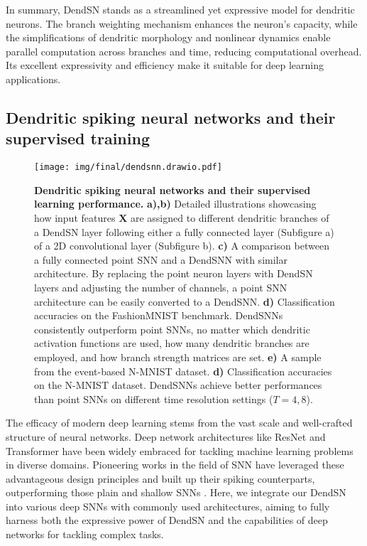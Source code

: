 In summary, DendSN stands as a streamlined yet expressive model for dendritic neurons. The branch weighting mechanism enhances the neuron's capacity, while the simplifications of dendritic morphology and nonlinear dynamics enable parallel computation across branches and time, reducing computational overhead. Its excellent expressivity and efficiency make it suitable for deep learning applications.

\subsection*{Dendritic spiking neural networks and their supervised training}
\label{subsec:results-dendsnn}

\begin{figure*}[tp!]
    \centering
    \texttt{[image: img/final/dendsnn.drawio.pdf]}
    \caption{
        \textbf{Dendritic spiking neural networks and their supervised learning performance.}
        \textbf{a),b)} Detailed illustrations showcasing how input features $\mathbf{X}$ are assigned to different dendritic branches of a DendSN layer following either a fully connected layer (Subfigure a) of a 2D convolutional layer (Subfigure b).
        \textbf{c)} A comparison between a fully connected point SNN and a DendSNN with similar architecture. By replacing the point neuron layers with DendSN layers and adjusting the number of channels, a point SNN architecture can be easily converted to a DendSNN.
        \textbf{d)} Classification accuracies on the FashionMNIST benchmark. DendSNNs consistently outperform point SNNs, no matter which dendritic activation functions are used, how many dendritic branches are employed, and how branch strength matrices are set.
        \textbf{e)} A sample from the event-based N-MNIST dataset. 
        \textbf{d)} Classification accuracies on the N-MNIST dataset. DendSNNs achieve better performances than point SNNs on different time resolution settings ($T=4,8$).
    }
    \label{fig:dendsnn}
\end{figure*}

The efficacy of modern deep learning stems from the vast scale and well-crafted structure of neural networks. Deep network architectures like ResNet \cite{he2016resnet} and Transformer \cite{vaswani2017transformer} have been widely embraced for tackling machine learning problems in diverse domains. Pioneering works in the field of SNN have leveraged these advantageous design principles and built up their spiking counterparts, outperforming those plain and shallow SNNs \cite{zheng2020going,fang2021sew,hu2023advancing,zhou2023spikformer,zhou2023spikingformer,yao2023spikedriventransformer,yao2024spikedriventransformer}. Here, we integrate our DendSN into various deep SNNs with commonly used architectures, aiming to fully harness both the expressive power of DendSN and the capabilities of deep networks for tackling complex tasks.

